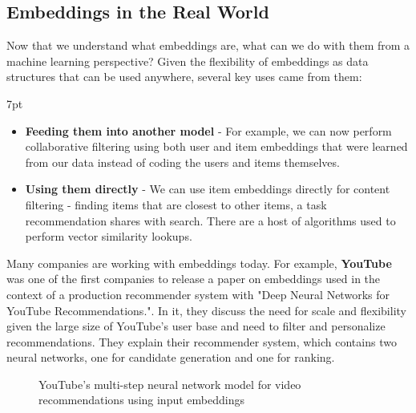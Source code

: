 \documentclass[11pt, table]{diazessay} %
\newenvironment{formal}{%
  \def\FrameCommand{%
    \hspace{1pt}%
    {\color{w_lightblue}\vrule width 2pt}%
    {\color{formalshade}\vrule width 4pt}%
    \colorbox{formalshade}%
  }%
  \MakeFramed{\advance\hsize-\width\FrameRestore}%
  \noindent\hspace{-4.55pt}%
  \begin{adjustwidth}{}{7pt}%
  \vspace{2pt}\vspace{2pt}%
}
{%
  \vspace{2pt}\end{adjustwidth}\endMakeFramed%
}
\begin{document}
\begin{sloppypar}
\subsection{Embeddings in the Real World}

Now that we understand what embeddings are, what can we do with them from a machine learning perspective? Given the flexibility of embeddings as data structures that can be used anywhere, several key uses came from them:

\begin{formal}
\begin{itemize}
\item\textbf{Feeding them into another model} - For example, we can now perform collaborative filtering using both user and item embeddings that were learned from our data instead of coding the users and items themselves. 
\item\textbf{Using them directly} - We can use item embeddings directly for content filtering - finding items that are closest to other items, a task recommendation shares with search. There are a host of algorithms used to perform vector similarity lookups. 
\end{itemize}
\end{formal}

Many companies are working with embeddings today.  For example, \textbf{YouTube }was one of the first companies to release a paper on embeddings used in the context of a production recommender system with "Deep Neural Networks for YouTube Recommendations."\citep{covington2016deep}. In it, they discuss the need for scale and flexibility given the large size of YouTube's user base and need to filter and personalize recommendations. They explain their recommender system, which contains two neural networks, one for candidate generation and one for ranking. 

\begin{figure}[H]
\caption{YouTube's multi-step neural network model for video recommendations using input embeddings\citep{covington2016deep}}
\end{figure}


\end{sloppypar}
\end{document}
